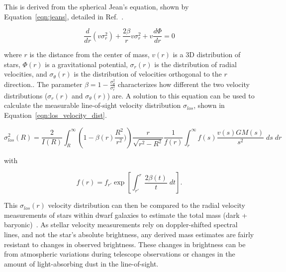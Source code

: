     This is derived from the spherical Jean's equation, shown by Equation~\ref{eqn:jeans}, detailed in Ref.~\cite{galactic_dynamics}.
    
    \begin{equation}\label{eqn:jeans}
      \frac{d}{dr} \left ( v \sigma_r^2\right) + \frac{2 \beta}{r}v \sigma_r^2 + v \frac{d \Phi}{dr}=0
    \end{equation}
    
    where $r$ is the distance from the center of mass, $v(r)$ is a 3D distribution of stars, $\Phi(r)$ is a gravitational potential, $\sigma_r(r)$ is the distribution of radial velocities, and $\sigma_\theta(r)$ is the distribution of velocities orthogonal to the $r$ direction..
    The parameter $\beta = 1 - \frac{\sigma_{\theta}^2}{\sigma_r^2}$ characterizes how different the two velocity distributions ($\sigma_r(r)$ and $\sigma_{\theta}(r)$) are.
    A solution to this equation can be used to calculate the measurable line-of-sight velocity distribution $\sigma_{los}$, shown in Equation~\ref{eqn:los_velocity_dist}.
    
    \begin{equation}\label{eqn:los_velocity_dist}
      \sigma_{los}^2 \left ( R \right ) = \frac{2}{I(R)} \int_R^{\infty} \left ( 1 - \beta(r) \frac{R^2}{r^2}) \right ) \frac{r}{\sqrt{r^2-R^2}} \frac{1}{f(r)} \int_r^\infty f(s) \frac{v(s)GM(s)}{s^2} \; ds\; dr
    \end{equation}
    
    with
    
    \begin{equation}
      f(r) = f_{r'} \exp \left [ \int_{r'}^r \frac{2 \beta(t) }{t} \; dt \right ] .
    \end{equation}
    
    This $\sigma_{los}(r)$ velocity distribution can then be compared to the radial velocity measurements of stars within dwarf galaxies to estimate the total mass (dark + baryonic)~\cite{dwarf_gal_vel_dispersion,dwarf_gal_vel_dispersion_a,dwarf_jfactors_no_priors}.
    As stellar velocity measurements rely on doppler-shifted spectral lines, and not the star's absolute brightness, any derived mass estimates are fairly resistant to changes in observed brightness.
    These changes in brightness can be from atmospheric variations during telescope observations or changes in the amount of light-absorbing dust in the line-of-sight.
    

